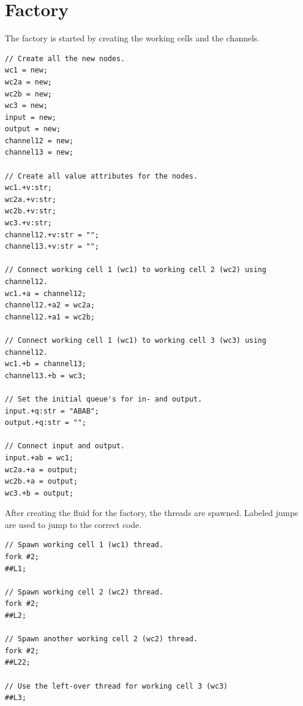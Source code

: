 \documentclass[a4paper,12px]{article}
\begin{document}
\newcommand{\Sum}[2]{\sum^{#2}_{#1}}
\newcommand{\E}[1]{{\mathbb{E}\left[#1\right]}}
\newcommand{\var}[1]{{\text{var}\left[#1\right]}}
\newcommand{\diffpart}[1]{\frac{\partial}{\partial{} #1}}
\newcommand{\?}{\stackrel{?}{=}}
\newcommand{\intinf}{\int\limits_{-\infty}^{\infty}}
\newcommand{\intnulinf}{\int\limits_{0}^{\infty}}
\newcommand{\intpi}{\int\limits_{0}^{2\pi}}
\newcommand{\argmin}[1]{\underset{#1}{\mathop{\mathrm{argmin}}}}
\newcommand{\argmax}[1]{\underset{#1}{\mathop{\mathrm{argmax}}}}


\section{Factory}

The factory is started by creating the working cells and the channels.

\begin{verbatim}
// Create all the new nodes.
wc1 = new;
wc2a = new;
wc2b = new;
wc3 = new;
input = new;
output = new;
channel12 = new;
channel13 = new;

// Create all value attributes for the nodes.
wc1.+v:str;
wc2a.+v:str;
wc2b.+v:str;
wc3.+v:str;
channel12.+v:str = "";
channel13.+v:str = "";

// Connect working cell 1 (wc1) to working cell 2 (wc2) using channel12.
wc1.+a = channel12;
channel12.+a2 = wc2a;
channel12.+a1 = wc2b;

// Connect working cell 1 (wc1) to working cell 3 (wc3) using channel12.
wc1.+b = channel13;
channel13.+b = wc3;

// Set the initial queue's for in- and output.
input.+q:str = "ABAB";
output.+q:str = "";

// Connect input and output.
input.+ab = wc1;
wc2a.+a = output;
wc2b.+a = output;
wc3.+b = output;
\end{verbatim}

After creating the fluid for the factory, the threads are spawned. Labeled jumps  are used to jump to the correct code.

\begin{verbatim}
// Spawn working cell 1 (wc1) thread.
fork #2;
##L1;

// Spawn working cell 2 (wc2) thread.
fork #2;
##L2;

// Spawn another working cell 2 (wc2) thread.
fork #2;
##L22;

// Use the left-over thread for working cell 3 (wc3)
##L3;
\end{verbatim}
\end{document}

